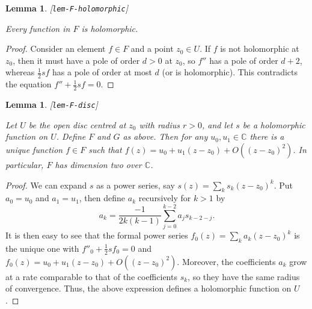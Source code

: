 \documentclass[reqno]{amsart}
\newcommand{\lbl}[1]{\label{#1}\textup{[\texttt{#1}]}\par}
\newcommand{\lbl}{\label}
\newcommand{\C}         {{\mathbb{C}}}
\newcommand{\half}      {\tfrac{1}{2}}
\renewcommand{\:}{\colon}
\newtheorem{lemma}[theorem]{Lemma}
\theoremstyle{definition}
\begin{document}
\begin{lemma}\lbl{lem-F-holomorphic}
 Every function in $F$ is holomorphic.
\end{lemma}
\begin{proof}
 Consider an element $f\in F$ and a point $z_0\in U$.  If $f$ is not
 holomorphic at $z_0$, then it must have a pole of order $d>0$ at
 $z_0$, so $f''$ has a pole of order $d+2$, whereas $\half sf$ has a
 pole of order at most $d$ (or is holomorphic).  This contradicts the
 equation $f''+\half sf=0$.
\end{proof}

\begin{lemma}\lbl{lem-F-disc}
 Let $U$ be the open disc centred at $z_0$ with radius $r>0$, and let
 $s$ be a holomorphic function on $U$.  Define $F$ and $G$ as above.
 Then for any $u_0,u_1\in\C$ there is a unique function $f\in F$ such
 that $f(z)=u_0+u_1(z-z_0)+O((z-z_0)^2)$.  In particular, $F$ has
 dimension two over $\C$.
\end{lemma}
\begin{proof}
 We can expand $s$ as a power series, say $s(z)=\sum_ks_k(z-z_0)^k$.
 Put $a_0=u_0$ and $a_1=u_1$, then define $a_k$ recursively for $k>1$
 by
 \[ a_k = \frac{-1}{2k(k-1)}\sum_{j=0}^{k-2}a_js_{k-2-j}. \] It is
 then easy to see that the formal power series
 $f_0(z)=\sum_ka_k(z-z_0)^k$ is the unique one with $f''_0+\half
 sf_0=0$ and $f_0(z)=u_0+u_1(z-z_0)+O((z-z_0)^2)$.  Moreover, the
 coefficients $a_k$ grow at a rate comparable to that of the
 coefficients $s_k$, so they have the same radius of convergence.
 Thus, the above expression defines a holomorphic function on $U$.
\end{proof}
\end{document}
